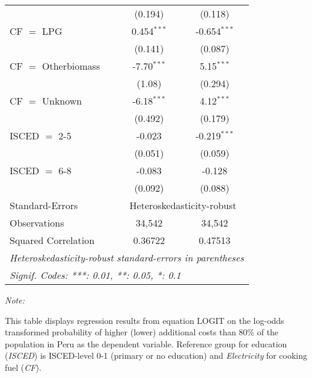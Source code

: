 \begin{table}[htbp!]
\begin{adjustbox}{width = 1\textwidth, max height = 0.95\textheight, center}
\begin{threeparttable}[b]
\begin{tabular}{lcc}
                                 & (0.194)       & (0.118)\\   
            CF $=$ LPG           & 0.454$^{***}$ & -0.654$^{***}$\\   
                                 & (0.141)       & (0.087)\\   
            CF $=$ Otherbiomass  & -7.70$^{***}$ & 5.15$^{***}$\\   
                                 & (1.08)        & (0.294)\\   
            CF $=$ Unknown       & -6.18$^{***}$ & 4.12$^{***}$\\   
                                 & (0.492)       & (0.179)\\   
            ISCED $=$ 2-5        & -0.023        & -0.219$^{***}$\\   
                                 & (0.051)       & (0.059)\\   
            ISCED $=$ 6-8        & -0.083        & -0.128\\   
                                 & (0.092)       & (0.088)\\   
            \midrule 
            Standard-Errors & \multicolumn{2}{c}{Heteroskedasticity-robust} \\ 
            Observations         & 34,542        & 34,542\\  
            Squared Correlation  & 0.36722       & 0.47513\\  
            \midrule \midrule
            \multicolumn{3}{l}{\emph{Heteroskedasticity-robust standard-errors in parentheses}}\\
            \multicolumn{3}{l}{\emph{Signif. Codes: ***: 0.01, **: 0.05, *: 0.1}}\\
         \end{tabular}
         
         \begin{tablenotes}\item \medskip \textit{Note:}
            \item This table displays regression results from equation LOGIT on the log-odds transformed probability of higher (lower) additional costs than 80\% of the population in Peru as the dependent variable. Reference group for education (\textit{ISCED}) is ISCED-level 0-1 (primary or no education) and \textit{Electricity} for cooking fuel (\textit{CF}).
         \end{tablenotes}
      \end{threeparttable}
   \end{adjustbox}
\end{table}



